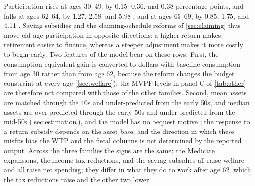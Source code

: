 Participation rises at ages 30--49, by 0.15, 0.36, and 0.38 percentage points, and falls at ages 62--64, by 1.27, 2.58, and 5.98 \pp, and at ages 65--69, by 0.85, 1.75, and 4.11 \pp. %
Saving subsidies and the claiming-schedule reforms of \autoref{sec:claiming} thus move old-age participation in opposite directions: a higher return makes retirement easier to finance, whereas a steeper adjustment makes it more costly to begin early. Two features of the model bear on these rows. First, the consumption-equivalent gain is converted to dollars with baseline consumption from age 30 rather than from age 62, because the reform changes the budget constraint at every age (\autoref{sec:welfare}); the MVPF levels in panel C of \autoref{tab:other} are therefore not compared with those of the other families. %
Second, mean assets are matched through the 40s and under-predicted from the early 50s, and median assets are over-predicted through the early 50s and under-predicted from the mid-50s (\autoref{sec:estimation}), and the model has no bequest motive \citep{Denardi2010,lockwood2018incidental}; the response to a return subsidy depends on the asset base, and the direction in which these misfits bias the WTP and the fiscal columns is not determined by the reported output. %
Across the three families the signs are the same: the Medicare expansions, the income-tax reductions, and the saving subsidies all raise welfare and all raise net spending; they differ in what they do to work after age 62, which the tax reductions raise and the other two lower. %
